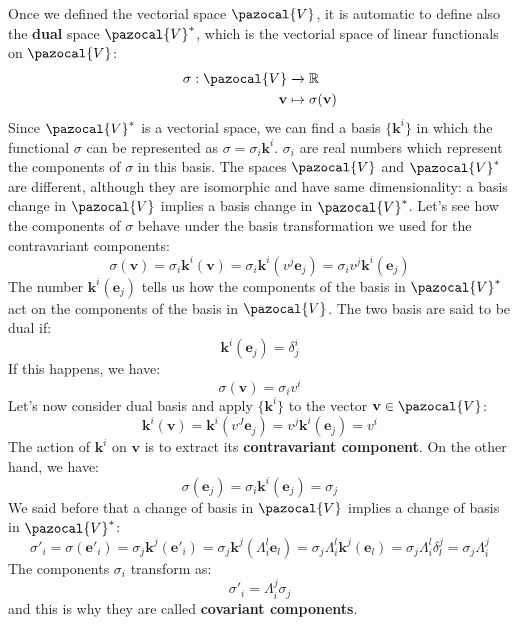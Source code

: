 \documentclass[../main.tex]{subfiles}
\begin{document}
Once we defined the vectorial space $\pazocal{V}$, it is automatic to define also the \textbf{dual} space $\pazocal{V}^*$, which is the vectorial space of linear functionals on $\pazocal{V}$:
\begin{align*}
\sigma:\pazocal{V}&\xrightarrow[]{}\mathbb{R}\\
\textbf{v}&\mapsto\sigma(\textbf{v})
\end{align*}
Since $\pazocal{V}^*$ is a vectorial space, we can find a basis $\{\textbf{k}^i\}$ in which the functional $\sigma$ can be represented as $\sigma=\sigma_i\textbf{k}^i$. $\sigma_i$ are real numbers which represent the components of $\sigma$ in this basis. The spaces $\pazocal{V}$ and $\pazocal{V}^*$ are different, although they are isomorphic and have same dimensionality: a basis change in $\pazocal{V}$ implies a basis change in $\pazocal{V}^*$. Let's see how the components of $\sigma$ behave under the basis transformation we used for the contravariant components:
\[
\sigma(\textbf{v})=\sigma_i\textbf{k}^i(\textbf{v})=\sigma_i\textbf{k}^i(v^j\textbf{e}_j)=\sigma_iv^j\textbf{k}^i(\textbf{e}_j)
\]
The number $\textbf{k}^i(\textbf{e}_j)$ tells us how the components of the basis in $\pazocal{V}^*$ act on the components of the basis in $\pazocal{V}$. The two basis are said to be dual if:
\[
\textbf{k}^i(\textbf{e}_j)=\delta^i_j
\]
If this happens, we have:
\[
\sigma(\textbf{v})=\sigma_iv^i
\]
Let's now consider dual basis and apply $\{\textbf{k}^i\}$ to the vector $\textbf{v}\in\pazocal{V}$:
\[
\textbf{k}^i(\textbf{v})=\textbf{k}^i(v^J\textbf{e}_j)=v^j\textbf{k}^i(\textbf{e}_j)=v^i
\]
The action of $\textbf{k}^i$ on $\textbf{v}$ is to extract its \textbf{contravariant component}. On the other hand, we have:
\[
\sigma(\textbf{e}_j)=\sigma_i\textbf{k}^i(\textbf{e}_j)=\sigma_j
\]
We said before that a change of basis in $\pazocal{V}$ implies a change of basis in $\pazocal{V}^*$:
\[
\sigma'_i=\sigma(\textbf{e}'_i)=\sigma_j\textbf{k}^j(\textbf{e}'_i)=\sigma_j\textbf{k}^j(\Lambda^l_i\textbf{e}_l)=\sigma_j\Lambda^l_i\textbf{k}^j(\textbf{e}_l)=\sigma_j\Lambda^l_i\delta^j_l=\sigma_j\Lambda^j_i
\]
The components $\sigma_i$ transform as:
\[
\sigma'_i=\Lambda^j_i\sigma_j
\]
and this is why they are called \textbf{covariant components}.
\end{document}

